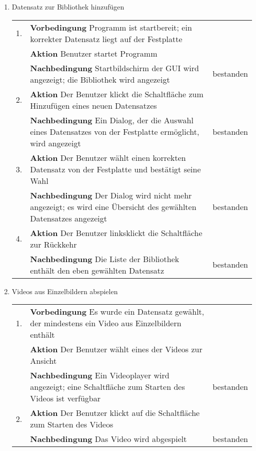 \begin{enumerate} [label=\bfseries /TS \arabic*0/, leftmargin=*]
	\item Datensatz zur Bibliothek hinzufügen \newline \newline
	\begin{tabular}{@{}rp{4in}|l}
	1. & \textbf{Vorbedingung} Programm ist startbereit; ein korrekter Datensatz liegt auf der Festplatte & \\
	   & \textbf{Aktion} Benutzer startet Programm & \\
	   & \textbf{Nachbedingung} Startbildschirm der GUI wird angezeigt; die Bibliothek wird angezeigt & bestanden \\
	\hline	
	2. & \textbf{Aktion} Der Benutzer klickt die Schaltfläche zum Hinzufügen eines neuen Datensatzes & \\
	   & \textbf{Nachbedingung} Ein Dialog, der die Auswahl eines Datensatzes von der Festplatte ermöglicht, wird angezeigt & bestanden \\
	\hline	
	3. & \textbf{Aktion} Der Benutzer wählt einen korrekten Datensatz von der Festplatte und bestätigt seine Wahl & \\
	   & \textbf{Nachbedingung} Der Dialog wird nicht mehr angezeigt; es wird eine Übersicht des gewählten Datensatzes angezeigt & bestanden \\
	\hline	
	4. & \textbf{Aktion} Der Benutzer linksklickt die Schaltfläche zur Rückkehr & \\
	   & \textbf{Nachbedingung} Die Liste der Bibliothek enthält den eben gewählten Datensatz & bestanden \\
	\end{tabular}
	\newline

	\item Videos aus Einzelbildern abspielen \newline \newline
	\begin{tabular}{@{}rp{4in}|l}
	1. & \textbf{Vorbedingung} Es wurde ein Datensatz gewählt, der mindestens ein Video aus Einzelbildern enthält & \\
	   & \textbf{Aktion} Der Benutzer wählt eines der Videos zur Ansicht & \\
	   & \textbf{Nachbedingung} Ein Videoplayer wird angezeigt; eine Schaltfläche zum Starten des Videos ist verfügbar & bestanden \\
	\hline
	2. & \textbf{Aktion} Der Benutzer klickt auf die Schaltfläche zum Starten des Videos & \\
	   & \textbf{Nachbedingung} Das Video wird abgespielt & bestanden \\
	\end{tabular}
	\newpage


\end{enumerate}
